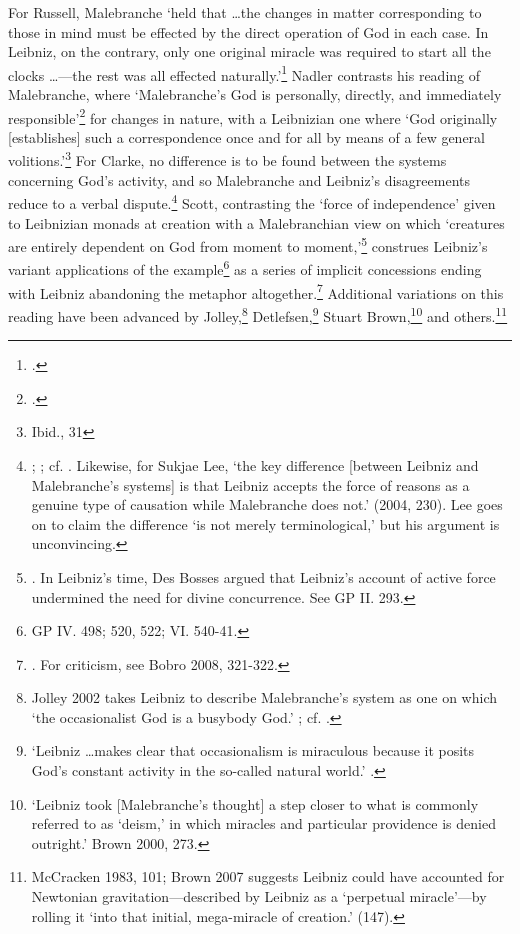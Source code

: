 \documentclass{article}
\begin{document}
For Russell, Malebranche `held that \ldots the changes in matter
corresponding to those in mind must be effected by the direct operation
of God in each case. In Leibniz, on the contrary, only one original
miracle was required to start all the clocks \ldots---the rest
was all effected naturally.'\footnote{\autocite[137]{Russell1951}.} Nadler
contrasts his reading of Malebranche, where `Malebranche's God is
personally, directly, and immediately responsible'\footnote{\autocite[32]{Nadler1993}.} for changes in nature, with a Leibnizian one where `God
originally {[}establishes{]} such a correspondence once and for all by
means of a few general volitions.'\footnote{Ibid., 31} For Clarke, no
difference is to be found between the systems concerning God's activity,
and so Malebranche and Leibniz's disagreements reduce to a verbal
dispute.\footnote{\autocite[121]{Clarke1989}; \autocite[passim]{Clarke1995}; cf. \autocite[39]{Black1997}. Likewise, for Sukjae Lee, `the key difference {[}between Leibniz
  and Malebranche's systems{]} is that Leibniz accepts the force of
  reasons as a genuine type of causation while Malebranche does not.'
  (2004, 230). Lee goes on to claim the difference `is not merely
  terminological,' but his argument is unconvincing.} Scott, contrasting
the `force of independence' given to Leibnizian monads at creation with
a Malebranchian view on which `creatures are entirely dependent on God
from moment to moment,'\footnote{\autocite[452]{Scott1997}. In Leibniz's time, Des
  Bosses argued that Leibniz's account of active force undermined the
  need for divine concurrence. See GP II. 293.} construes Leibniz's
variant applications of the example\footnote{GP IV. 498; 520, 522; VI.
  540-41.} as a series of implicit concessions ending with Leibniz
abandoning the metaphor altogether.\footnote{\autocite[462]{Scott1997}. For
  criticism, see Bobro 2008, 321-322.} Additional variations on this
reading have been advanced by Jolley,\footnote{Jolley 2002 takes Leibniz
  to describe Malebranche's system as one on which `the occasionalist
  God is a busybody God.' \autocite[246]{Jolley2002}; cf. \autocite[106-107]{Jolley1990}.}
Detlefsen,\footnote{`Leibniz \ldots makes clear that
  occasionalism is miraculous because it posits God's constant activity
  in the so-called natural world.' \autocite[443]{Detlefsen2003}.} Stuart
Brown,\footnote{`Leibniz took {[}Malebranche's thought{]} a step closer
  to what is commonly referred to as `deism,' in which miracles and
  particular providence is denied outright.' Brown 2000, 273.} and
others.\footnote{McCracken 1983, 101; Brown 2007 suggests Leibniz could
  have accounted for Newtonian gravitation---described by Leibniz as a
  `perpetual miracle'---by rolling it `into that initial, mega-miracle
  of creation.' (147).}
\end{document}
